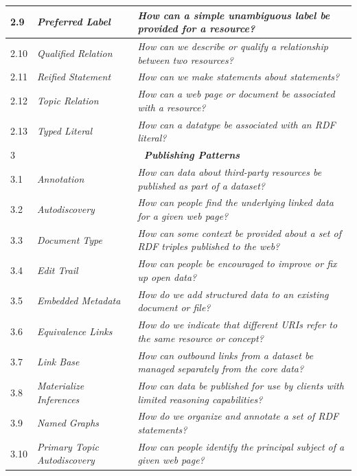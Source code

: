 \begin{longtable}[c]{|l|p{7cm}|p{8cm}|}
  2.9 &  \textit{Preferred Label} &  \textit{How can a simple unambiguous label be provided for a resource? }\\ \hline    
  2.10 &  \textit{Qualified Relation} &  \textit{How can we describe or qualify a relationship between two resources?} \\ \hline   
  2.11 &  \textit{Reified Statement} &  \textit{How can we make statements about statements?} \\ \hline    
  2.12 &  \textit{Topic Relation} &  \textit{How can a web page or document be associated with a resource?} \\ \hline      
  2.13 &  \textit{Typed Literal} &  \textit{How can a datatype be associated with an RDF literal?} \\ \hline        
    3& \multicolumn{2}{|c|}{\textbf{\textit{Publishing Patterns}}}\\ \hline
  3.1 &  \textit{Annotation} &  \textit{How can data about third-party resources be published as part of a dataset?}  \\ \hline    
  3.2 &  \textit{Autodiscovery} &   \textit{How can people find the underlying linked data for a given web page?}  \\ \hline    
  3.3 &  \textit{Document Type} & \textit{How can some context be provided about a set of RDF triples published to the web?} \\ \hline     
  3.4 &  \textit{Edit Trail} &  \textit{How can people be encouraged to improve or fix up open data?} \\ \hline    
  3.5 &  \textit{Embedded Metadata} &  \textit{How do we add structured data to an existing document or file?} \\ \hline    
  3.6 &  \textit{Equivalence Links} &  \textit{How do we indicate that different \gls{URI}s refer to the same resource or concept?} \\ \hline    
  3.7 &  \textit{Link Base} &  \textit{How can outbound links from a dataset be managed separately from the core data?} \\ \hline     
  3.8 &  \textit{Materialize Inferences} &  \textit{How can data be published for use by clients with limited reasoning capabilities?} \\ \hline     
  3.9 &  \textit{Named Graphs} & \textit{How do we organize and annotate a set of RDF statements?} \\ \hline    
  3.10 &  \textit{Primary Topic Autodiscovery} & \textit{How can people identify the principal subject of a given web page?}  \\ \hline    

\end{longtable}
